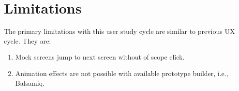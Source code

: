 \section{Limitations}

The primary limitations with this user study cycle are similar to previous UX cycle. They are: \\

\begin{enumerate}
\item Mock screens jump to next screen without of scope click.
\item Animation effects are not possible with available prototype builder, i.e., Balsamiq.
\end{enumerate}
